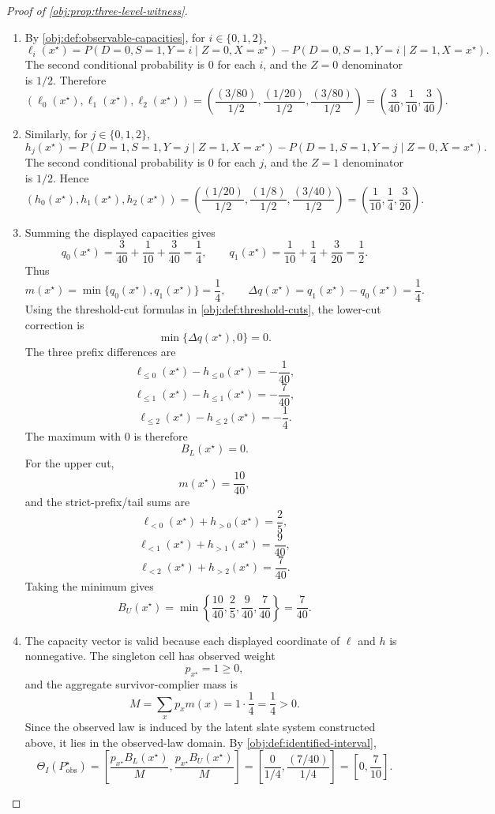 \documentclass[11pt]{article}
\begin{document}
\begin{proof}[Proof of \cref{obj:prop:three-level-witness}]
\begin{enumerate}
\item By \cref{obj:def:observable-capacities}, for \(i\in\{0,1,2\}\),
\[
\ell_i(x^{\star})
=
P(D=0,S=1,Y=i\mid Z=0,X=x^{\star})
-
P(D=0,S=1,Y=i\mid Z=1,X=x^{\star}).
\]
The second conditional probability is \(0\) for each \(i\), and the \(Z=0\) denominator is \(1/2\).  Therefore
\[
(\ell_0(x^{\star}),\ell_1(x^{\star}),\ell_2(x^{\star}))
=
\left(
\frac{(3/80)}{1/2},
\frac{(1/20)}{1/2},
\frac{(3/80)}{1/2}
\right)
=
\left(\frac{3}{40},\frac{1}{10},\frac{3}{40}\right).
\]

\item Similarly, for \(j\in\{0,1,2\}\),
\[
h_j(x^{\star})
=
P(D=1,S=1,Y=j\mid Z=1,X=x^{\star})
-
P(D=1,S=1,Y=j\mid Z=0,X=x^{\star}).
\]
The second conditional probability is \(0\) for each \(j\), and the \(Z=1\) denominator is \(1/2\).  Hence
\[
(h_0(x^{\star}),h_1(x^{\star}),h_2(x^{\star}))
=
\left(
\frac{(1/20)}{1/2},
\frac{(1/8)}{1/2},
\frac{(3/40)}{1/2}
\right)
=
\left(\frac{1}{10},\frac14,\frac{3}{20}\right).
\]

\item Summing the displayed capacities gives
\[
q_0(x^{\star})=\frac{3}{40}+\frac{1}{10}+\frac{3}{40}=\frac14,
\qquad
q_1(x^{\star})=\frac{1}{10}+\frac14+\frac{3}{20}=\frac12.
\]
Thus
\[
m(x^{\star})=\min\{q_0(x^{\star}),q_1(x^{\star})\}=\frac14,
\qquad
\Delta q(x^{\star})=q_1(x^{\star})-q_0(x^{\star})=\frac14 .
\]
Using the threshold-cut formulas in \cref{obj:def:threshold-cuts}, the lower-cut correction is
\[
\min\{\Delta q(x^{\star}),0\}=0.
\]
The three prefix differences are
\[
\ell_{\le0}(x^{\star})-h_{\le0}(x^{\star})=-\frac{1}{40},
\]
\[
\ell_{\le1}(x^{\star})-h_{\le1}(x^{\star})=-\frac{7}{40},
\]
\[
\ell_{\le2}(x^{\star})-h_{\le2}(x^{\star})=-\frac14 .
\]
The maximum with \(0\) is therefore
\[
B_L(x^{\star})=0.
\]
For the upper cut,
\[
m(x^{\star})=\frac{10}{40},
\]
and the strict-prefix/tail sums are
\[
\ell_{<0}(x^{\star})+h_{>0}(x^{\star})=\frac25,
\]
\[
\ell_{<1}(x^{\star})+h_{>1}(x^{\star})=\frac{9}{40},
\]
\[
\ell_{<2}(x^{\star})+h_{>2}(x^{\star})=\frac{7}{40}.
\]
Taking the minimum gives
\[
B_U(x^{\star})
=
\min\left\{\frac{10}{40},\frac25,\frac{9}{40},\frac{7}{40}\right\}
=
\frac{7}{40}.
\]

\item The capacity vector is valid because each displayed coordinate of \(\ell\) and \(h\) is nonnegative.  The singleton cell has observed weight
\[
p_{x^{\star}}=1\ge0,
\]
and the aggregate survivor-complier mass is
\[
M=\sum_x p_xm(x)=1\cdot \frac14=\frac14>0.
\]
Since the observed law is induced by the latent slate system constructed above, it lies in the observed-law domain.  By \cref{obj:def:identified-interval},
\[
\Theta_I(P_{\mathrm{obs}}^{\star})
=
\left[
\frac{p_{x^{\star}}B_L(x^{\star})}{M},
\frac{p_{x^{\star}}B_U(x^{\star})}{M}
\right]
=
\left[
\frac{0}{1/4},
\frac{(7/40)}{1/4}
\right]
=
\left[0,\frac{7}{10}\right].
\]


\end{enumerate}
\end{proof}
\end{document}
